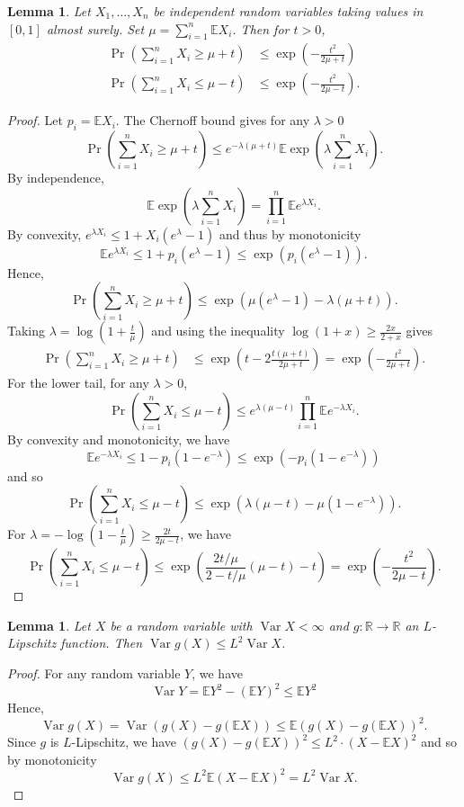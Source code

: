 \documentclass{article}
\newtheorem{lemma}[theorem]{Lemma}
\theoremstyle{remark}
\newcommand{\R}{\mathbb{R}}
\newcommand{\E}{\mathbb{E}}
\DeclareMathOperator{\var}{Var}
\newcommand{\1}{\mathbbm{1}}
\begin{document}
\begin{lemma}\label{lemma:chernoff}
Let $X_1, \ldots, X_n$ be independent random variables taking values in $[0, 1]$ almost surely. Set $\mu = \sum_{i=1}^n \E X_i$. Then for $t > 0$,
\begin{align*}
    \Pr\left(\sum_{i=1}^n X_i \ge \mu + t\right) &\le \exp\left(- \frac{t^2}{2\mu + t}\right)\\
    \Pr\left(\sum_{i=1}^n X_i \le \mu - t\right) &\le \exp\left(- \frac{t^2}{2\mu - t}\right).
\end{align*}    
\end{lemma}
\begin{proof}
    Let $p_i = \E X_i$. The Chernoff bound gives for any $\lambda > 0$
    \[\Pr\left(\sum_{i=1}^n X_i \ge \mu + t\right) \le e^{-\lambda(\mu + t)} \E \exp\left(\lambda \sum_{i=1}^n X_i\right).\]
    By independence,
    \[\E \exp\left(\lambda \sum_{i=1}^n X_i\right) = \prod_{i=1}^n \E e^{\lambda X_i}.\]
    By convexity, $e^{\lambda X_i} \le 1 + X_i (e^\lambda - 1)$ and thus by monotonicity 
    \[\E e^{\lambda X_i} \le 1 + p_i (e^{\lambda } - 1) \le \exp\left(p_i(e^\lambda - 1)\right).\] Hence,
    \[\Pr\left(\sum_{i=1}^n X_i \ge \mu + t\right) \le \exp\left(\mu(e^\lambda - 1) - \lambda(\mu + t)\right).\]
    Taking $\lambda = \log(1 + \frac{t}{\mu})$ and using the inequality $\log(1+x) \ge \frac{2x}{2+x}$ gives
    \begin{align*}
        \Pr\left(\sum_{i=1}^n X_i \ge \mu + t\right) &\le \exp\left(t - 2\frac{t(\mu + t)}{2\mu+t} \right) = \exp\left(-\frac{t^2}{2\mu+t}\right).
    \end{align*}
    For the lower tail, for any $\lambda > 0$, 
    \[\Pr\left(\sum_{i=1}^n X_i \le \mu - t\right) \le e^{\lambda(\mu - t)} \prod_{i=1}^n \E e^{-\lambda X_i}.\]
    By convexity and monotonicity, we have
    \[\E e^{-\lambda X_i} \le 1 - p_i(1- e^{-\lambda}) \le \exp\left(-p_i(1-e^{-\lambda})\right)\]
    and so
    \[\Pr\left(\sum_{i=1}^n X_i \le \mu - t\right) \le \exp\left(\lambda(\mu - t) - \mu(1-e^{-\lambda})\right).\]
    For $\lambda = -\log(1 - \frac{t}{\mu}) \ge \frac{2t}{2\mu - t}$, we have
    \[\Pr\left(\sum_{i=1}^n X_i \le \mu - t\right) \le \exp\left(\frac{2t/\mu}{2-t/\mu}(\mu - t) - t\right) = \exp\left(-\frac{t^2}{2\mu - t}\right).\]
\end{proof}

\begin{lemma}\label{lemma:varfn}
Let $X$ be a random variable with $\var X < \infty$ and $g \colon \R \to \R$ an $L$-Lipschitz function. Then $\var g(X) \le L^2 \var X$.
\end{lemma}
\begin{proof}
    For any random variable $Y$, we have
    \[\var Y = \E Y^2 - (\E Y)^2 \le \E Y^2\]
    Hence,
    \[\var g(X) = \var (g(X) - g(\E X)) \le \E(g(X) - g(\E X))^2.\]
    Since $g$ is $L$-Lipschitz, we have $(g(X) - g(\E X))^2 \le L^2 \cdot (X - \E X)^2$ and so by monotonicity
    \[\var g(X) \le L^2 \E(X - \E X)^2 = L^2 \var X. \]
\end{proof}
\end{document}
